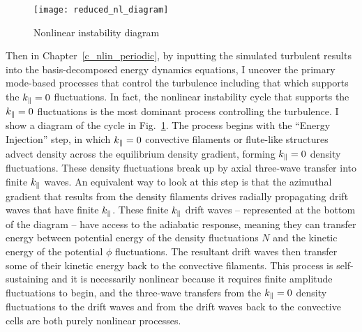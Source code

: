 \begin{figure}
\centerline{\texttt{[image: reduced\_nl\_diagram]}}
\caption{Nonlinear instability diagram}
\label{reduced_nl_diagram_intro}
\end{figure}

Then in Chapter~\ref{c_nlin_periodic}, by inputting the simulated turbulent results into the basis-decomposed energy dynamics equations, I uncover the primary mode-based processes that
control the turbulence including that which supports the $k_\parallel = 0$ fluctuations. In fact, the nonlinear instability 
cycle that supports the $k_\parallel = 0$ fluctuations is the most dominant process controlling the turbulence. I show a diagram of the cycle in Fig.~\ref{reduced_nl_diagram_intro}.
The process begins with the ``Energy Injection'' step, in which $k_\parallel = 0$ convective filaments or flute-like structures
advect density across the equilibrium density gradient, forming $k_\parallel = 0$ density fluctuations. 
These density fluctuations break up by axial three-wave transfer into finite $k_\parallel$ waves. An equivalent way to look at this step is that the azimuthal gradient that results from the density filaments
drives radially propagating drift waves that have finite $k_\parallel$. 
These finite $k_\parallel$ drift waves -- represented at the bottom of the diagram -- have access to the adiabatic response, 
meaning they can transfer energy between potential energy of the density fluctuations $N$ and the kinetic energy
of the potential $\phi$ fluctuations. The resultant drift waves then transfer some of their kinetic energy back to the convective filaments. 
This process is self-sustaining and it is necessarily nonlinear because it requires finite amplitude fluctuations to begin, and the three-wave transfers from the $k_\parallel = 0$ density fluctuations
to the drift waves and from the drift waves back to the convective cells are both purely nonlinear processes. 

